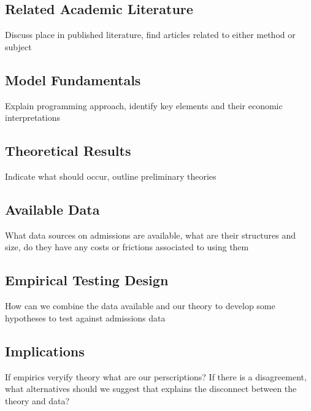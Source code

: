 \documentclass[10pt]{article}
\begin{document}
\subsection*{Related Academic Literature}

{\color{red} Discuss place in published literature, find articles related to either method or subject}

\subsection*{Model Fundamentals}

{\color{red} Explain programming approach, identify key elements and their economic interpretations}

\subsection*{Theoretical Results}

{\color{red} Indicate what should occur, outline preliminary theories}

\subsection*{Available Data}

{\color{red} What data sources on admissions are available, what are their structures and size, do they have any costs or frictions associated to using them}

\subsection*{Empirical Testing Design}

{\color{red} How can we combine the data available and our theory to develop some hypotheses to test against admissions data}

\subsection*{Implications}

{\color{red} If empirics veryify theory what are our perscriptions? If there is a disagreement, what alternatives should we suggest that explains the disconnect between the theory and data?}

%
\end{document}
